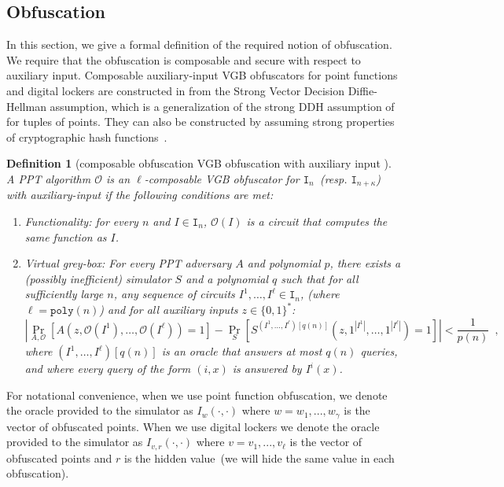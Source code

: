 \documentclass[11pt]{article}
\newcommand{\zo}{\ensuremath{\{0, 1\}}}
\newcommand{\poly}{\ensuremath{\mathtt{poly}}\xspace}
\newtheorem{definition}[theorem]{Definition}
\begin{document}
\subsection{Obfuscation}
\label{sec:obfuscation def}

In this section, we give a formal definition of the required notion of obfuscation.
We require that the obfuscation is composable and secure with respect to auxiliary input. Composable auxiliary-input VGB obfuscators for point functions and digital lockers are constructed in \cite[Theorem 6.1]{bitansky2010strong} from the Strong Vector Decision Diffie-Hellman assumption, which is a generalization of the strong DDH assumption of \cite{canetti1997towards} for tuples of points. They can also be constructed by assuming strong properties of cryptographic hash functions~\cite{canetti1997towards}.

\begin{definition}[composable obfuscation VGB obfuscation with auxiliary input \cite{bitansky2010strong}]
\label{def:obf} A PPT algorithm $\mathcal{O}$ is an $\ell$-composable VGB obfuscator for $\mathtt{I}_{n}$~(resp. $\mathtt{I}_{n+\kappa}$) with auxiliary-input if the following conditions are met:
\begin{enumerate}
\item \emph{Functionality:} for every $n$ and $I \in \mathtt{I}_n$, $\mathcal{O}(I)$ is a circuit that computes the same function as $I$.
\item \emph{Virtual grey-box:}  For every PPT adversary $A$ and polynomial $p$, there exists a (possibly inefficient) simulator $S$ and a polynomial $q$ such that for all sufficiently large $n$, any  sequence of circuits $I^1,\dots,I^\ell \in \mathtt{I}_n$, (where $\ell=\poly(n)$) and for all auxiliary inputs $z\in \zo^*$:
\[
|\Pr_{A,\mathcal{O}}[A(z,\mathcal{O}(I^1),\dots,\mathcal{O}(I^\ell)) = 1] - \Pr_{S}[S^{(I^1,\dots,I^\ell)[q(n)]}(z, 1^{|I^1|},\dots,1^{|I^\ell|}) = 1] | < \frac{1}{p(n)} \enspace,
\]
where $(I^1,\dots,I^\ell)[q(n)]$ is an oracle that answers at most $q(n)$ queries, and where every query of the form $(i,x)$ is answered by $I^i(x)$.
\end{enumerate}
\end{definition}
For notational convenience, when we use point function obfuscation, we denote the oracle provided to the simulator as $I_w(\cdot, \cdot)$ where $w = w_1,..., w_\gamma$ is the vector of obfuscated points.  When we use digital lockers we denote the oracle provided to the simulator as $I_{v, r}(\cdot, \cdot)$ where $v = v_1,..., v_\ell$ is the vector of obfuscated points and $r$ is the hidden value~(we will hide the same value in each obfuscation).
\end{document}
